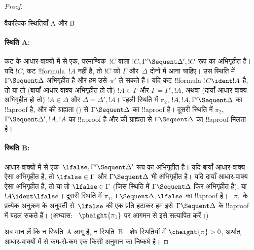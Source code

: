 \documentclass[../../../include/open-logic-section]{subfiles}
\begin{document}
\begin{proof}
\begin{center}
वैकल्पिक स्थितियाँ A और B
\end{center}

\paragraph{स्थिति A:} कट के आधार-वाक्यों में से एक, परमाण्विक~$!C$ वाला
$!C, \Gamma' \Sequent \Delta', !C$ रूप का अभिगृहीत है। यदि $!C$, कट
!!{formula}~$!A$ नहीं है, तो $!C$ को $\Gamma$ और~$\Delta$ दोनों में आना चाहिए।
उस स्थिति में $\Gamma \Sequent \Delta$ अभिगृहीत है और हम उसे~$\pi'$ ले सकते
हैं। यदि कट !!{formula} $!C \ident !A$ है, तो या तो (बायाँ आधार-वाक्य
अभिगृहीत हो तो) $!A \in \Gamma$ और $\Gamma = \Gamma', !A$, अथवा (दायाँ
आधार-वाक्य अभिगृहीत हो तो) $!A \in \Delta$ और $\Delta = \Delta', !A$। पहली
स्थिति में $\pi_2$, $!A, !A, \Gamma' \Sequent \Delta$ का !!a{proof} है, और
\LeftR{\Contraction} की ग्राह्यता () से
$\Gamma \Sequent \Delta$ का !!a{proof} है। दूसरी स्थिति में $\pi_2$, $\Gamma
\Sequent \Delta', !A, !A$ का !!a{proof} है और \RightR{\Contraction} की
ग्राह्यता से $\Gamma \Sequent \Delta$ का !!a{proof} मिलता है।

\paragraph{स्थिति B:} आधार-वाक्यों में से एक~$\lfalse, \Gamma' \Sequent
\Delta'$ रूप का अभिगृहीत है। यदि बायाँ आधार-वाक्य ऐसा अभिगृहीत है, तो
$\lfalse \in \Gamma$ और $\Gamma \Sequent \Delta$ भी अभिगृहीत है। यदि दायाँ
आधार-वाक्य ऐसा अभिगृहीत है, तो या तो $\lfalse \in \Gamma$ (जिस स्थिति में
$\Gamma \Sequent \Delta$ फिर अभिगृहीत है), या $!A \ident \lfalse$। दूसरी
स्थिति में $\pi_1$, $\Gamma \Sequent \Delta, \lfalse$ का !!a{proof} है।
~$\pi_1$ के प्रत्येक अनुक्रम के अनुवर्ती से~$\lfalse$ की एक प्रति हटाकर हम
इसे~$\Gamma \Sequent \Delta$ के !!a{proof} में बदल सकते हैं। (अभ्यास:
~$\pheight{\pi_1}$ पर आगमन से इसे सत्यापित करें।)

अब मान लें कि न स्थिति~A लागू है, न स्थिति~B। शेष स्थितियों में
$\cheight{\pi} > 0$, अर्थात् आधार-वाक्यों में से कम-से-कम एक किसी अनुमान का
निष्कर्ष है।


\end{proof}
\end{document}
